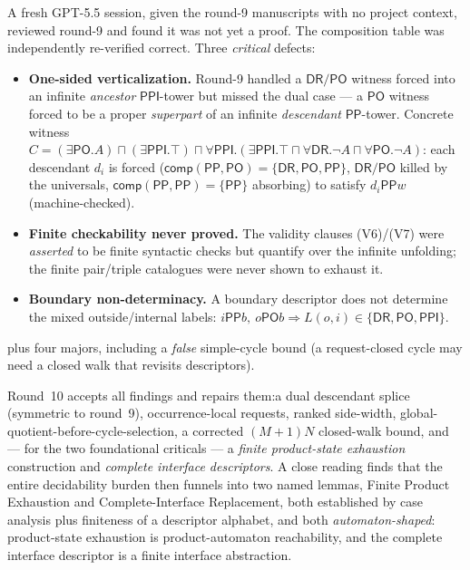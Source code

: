 \documentclass[
]{ceurart}
\theoremstyle{definition}
\newcommand{\DR}{\ensuremath{\mathsf{DR}}}
\newcommand{\PO}{\ensuremath{\mathsf{PO}}}
\newcommand{\PP}{\ensuremath{\mathsf{PP}}}
\newcommand{\PPI}{\ensuremath{\mathsf{PPI}}}
\newcommand{\comp}{\ensuremath{\mathsf{comp}}}
\begin{document}
A fresh GPT-5.5 session, given the round-9 manuscripts with no project
context, reviewed round-9 and found it was not yet a proof.  The
composition table was independently re-verified correct.  Three
\emph{critical} defects:
\begin{itemize}
  \item \textbf{One-sided verticalization.}  Round-9 handled a
    $\DR/\PO$ witness forced into an infinite \emph{ancestor}
    $\PPI$-tower but missed the dual case --- a $\PO$ witness forced
    to be a proper \emph{superpart} of an infinite \emph{descendant}
    $\PP$-tower.  Concrete witness
    $C=(\exists\PO.A)\sqcap(\exists\PPI.\top)\sqcap
    \forall\PPI.(\exists\PPI.\top\sqcap\forall\DR.\neg A\sqcap\forall\PO.\neg A)$:
    each descendant $d_i$ is forced
    ($\comp(\PP,\PO)=\{\DR,\PO,\PP\}$, $\DR/\PO$ killed by the
    universals, $\comp(\PP,\PP)=\{\PP\}$ absorbing) to satisfy
    $d_i\PP w$ (machine-checked).
  \item \textbf{Finite checkability never proved.}  The validity
    clauses (V6)/(V7) were \emph{asserted} to be finite syntactic
    checks but quantify over the infinite unfolding; the finite
    pair/triple catalogues were never shown to exhaust it.
  \item \textbf{Boundary non-determinacy.}  A boundary descriptor
    does not determine the mixed outside/internal labels:\@
    $i\PP b,\ o\PO b\Rightarrow L(o,i)\in\{\DR,\PO,\PPI\}$.
\end{itemize}
plus four majors, including a \emph{false} simple-cycle bound (a
request-closed cycle may need a closed walk that revisits
descriptors).

Round~10 accepts all findings and repairs them:\@ a dual descendant
splice (symmetric to round~9), occurrence-local requests, ranked
side-width, global-quotient-before-cycle-selection, a corrected
$(M{+}1)N$ closed-walk bound, and --- for the two foundational
criticals --- a \emph{finite product-state exhaustion} construction
and \emph{complete interface descriptors}.  A close reading finds
that the entire decidability burden then funnels into two named
lemmas, Finite Product Exhaustion and Complete-Interface Replacement,
both established by case analysis plus finiteness of a descriptor
alphabet, and both \emph{automaton-shaped}: product-state exhaustion
is product-automaton reachability, and the complete interface
descriptor is a finite interface abstraction.
\end{document}
